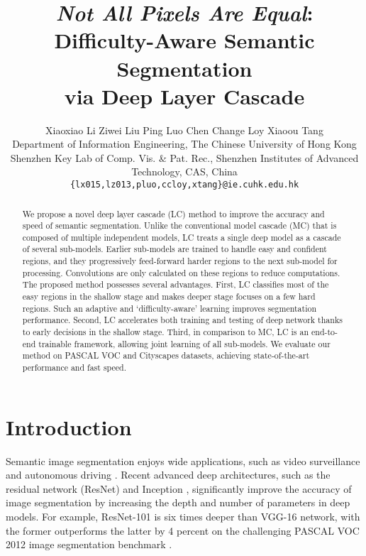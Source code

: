 \documentclass[10pt,twocolumn,letterpaper]{article}
\begin{document}
\title{\textit{Not All Pixels Are Equal}: Difficulty-Aware Semantic Segmentation \\ via Deep Layer Cascade}

\author{Xiaoxiao Li \hspace{9pt} Ziwei Liu \hspace{9pt} Ping Luo \hspace{9pt} Chen Change Loy \hspace{8pt} Xiaoou Tang\\
\small{Department of Information Engineering, The Chinese University of Hong Kong}\\
\small{Shenzhen Key Lab of Comp. Vis. \& Pat. Rec., Shenzhen Institutes of Advanced Technology, CAS, China}\\
{\tt\small \{lx015,lz013,pluo,ccloy,xtang\}@ie.cuhk.edu.hk}
}

\maketitle


\begin{abstract}
We propose a novel deep layer cascade (LC) method to improve the accuracy and speed of semantic segmentation. Unlike the conventional model cascade (MC) that is composed of multiple independent models, LC treats a single deep model as a cascade of several sub-models.
Earlier sub-models are trained to handle easy and confident regions, and they progressively feed-forward harder regions to the next sub-model for processing.
Convolutions are only calculated on these regions to reduce computations.
The proposed method possesses several advantages.
First, LC classifies most of the easy regions in the shallow stage and makes deeper stage focuses on a few hard regions. Such an adaptive and `difficulty-aware' learning
improves segmentation performance.
Second, LC accelerates both training and testing of deep network thanks to early decisions in the shallow stage.
Third, in comparison to MC, LC is an end-to-end trainable framework, allowing joint learning of all sub-models.
We evaluate our method on PASCAL VOC and Cityscapes datasets, achieving state-of-the-art performance and fast speed.  \end{abstract}

\section{Introduction}
\label{sec:intro}


Semantic image segmentation enjoys wide applications, such as video surveillance \cite{farabet2013learning, TSN2016ECCV} and autonomous driving \cite{geiger2012we, Cordts2016Cityscapes}.
Recent advanced deep architectures, such as the residual network (ResNet) \cite{He2015} and Inception \cite{szegedy2016inception}, significantly improve the accuracy of image segmentation by increasing the depth and number of parameters in deep models.
For example, ResNet-101 is six times deeper than VGG-16 \cite{simonyan2014very} network, with the former outperforms the latter by 4 percent on the challenging PASCAL VOC 2012 image segmentation benchmark \cite{everingham2010pascal}.
\end{document}
